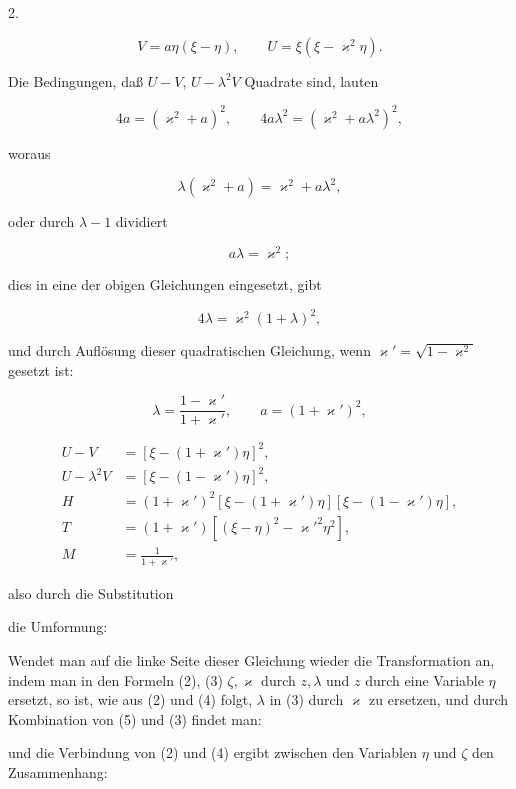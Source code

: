\begin{center}
2. 
\end{center}

\[
V = a\eta(\xi-\eta), \qquad U = \xi(\xi-\varkappa^2\eta).
\]

Die Bedingungen, daß $U-V$, $U-\lambda^2V$ Quadrate sind, lauten

\[
4a = (\varkappa^2+a)^2, \qquad 4a\lambda^2 = (\varkappa^2+a\lambda^2)^2,
\]

woraus

\[
\lambda(\varkappa^2+a) = \varkappa^2+a\lambda^2,
\]

oder durch $\lambda-1$ dividiert

\[
a\lambda = \varkappa^2;
\]

dies in eine der obigen Gleichungen eingesetzt, gibt

\[
4\lambda = \varkappa^2(1+\lambda)^2,
\]

und durch Auflösung dieser quadratischen Gleichung, wenn
$\varkappa'=\sqrt{1-\varkappa^2}$ gesetzt ist:

\[
\lambda = \frac{1-\varkappa'}{1+\varkappa'}, \qquad a=(1+\varkappa')^2,
\]

\[
\begin{aligned}
U-V &= [\xi-(1+\varkappa')\eta]^2,\\
U-\lambda^2V &= [\xi-(1-\varkappa')\eta]^2,\\
H &= (1+\varkappa')^2[\xi-(1+\varkappa')\eta][\xi-(1-\varkappa')\eta],\\
T &= (1+\varkappa')[(\xi-\eta)^2-\varkappa'^2\eta^2],\\
M &= \frac{1}{1+\varkappa'},
\end{aligned}
\]

also durch die Substitution


die Umformung:


Wendet man auf die linke Seite dieser Gleichung wieder die
 Transformation an, indem man in den Formeln (2), (3)
$\zeta,\varkappa$ durch $z,\lambda$ und $z$ durch eine Variable $\eta$
ersetzt, so ist, wie aus (2) und (4) folgt, $\lambda$ in (3) durch
$\varkappa$ zu ersetzen, und durch Kombination von (5) und (3) findet man:


und die Verbindung von (2) und (4) ergibt zwischen den Variablen $\eta$
und $\zeta$ den Zusammenhang:

